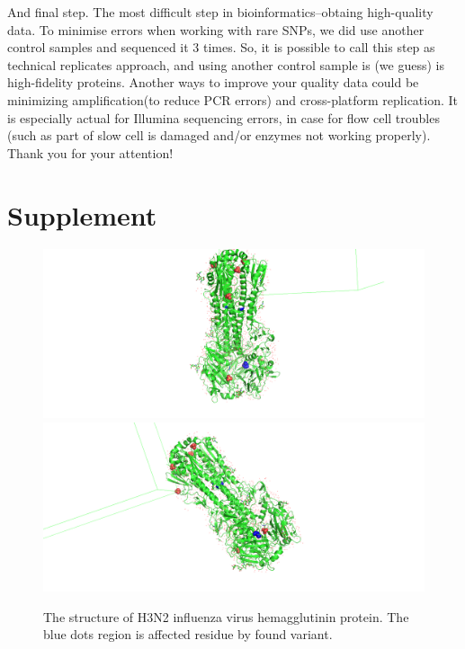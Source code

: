 \documentclass{article}
\begin{document}
And final step. The most difficult step in bioinformatics--obtaing high-quality data. To minimise errors when working with rare SNPs, we did use another control samples and sequenced it 3 times. So, it is possible to call this step as technical replicates approach, and using another control sample is (we guess) is high-fidelity proteins. Another ways to improve your quality data could be minimizing amplification(to reduce PCR errors) and cross-platform replication. It is especially actual for Illumina sequencing errors, in case for flow cell troubles (such as part of slow cell is damaged and/or enzymes not working properly).
Thank you for your attention!


 
\newpage
\section{Supplement}

\begin{figure}[h]
	\centering
	\includegraphics[scale=0.3]{all.png} 
	\includegraphics[scale=0.3]{all2.png} 
	\caption{ The structure of H3N2 influenza virus hemagglutinin protein. The blue dots region is affected residue by found variant.}
	\label{pdb}
\end{figure}
\end{document}

